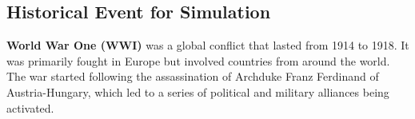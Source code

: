 \documentclass{article}
\newcommand{\yongfeng}[1]{{\small\color{blue}{\bf Yongfeng: #1}}}
\begin{document}



\subsection{Historical Event for Simulation}


\textbf{World War One (WWI)} was a global conflict that lasted from 1914 to 1918. It was primarily fought in Europe but involved countries from around the world. The war started following the assassination of Archduke Franz Ferdinand of Austria-Hungary, which led to a series of political and military alliances being activated.
\end{document}
